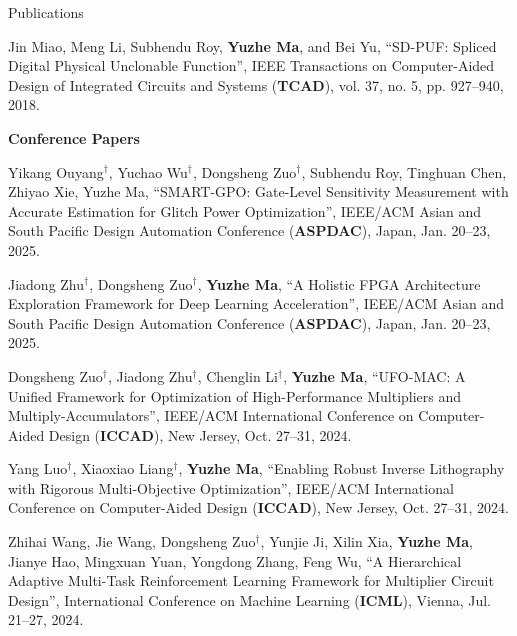 \begin{rSection}{Publications}
\begin{etaremune}
\item{
	Jin Miao, Meng Li, Subhendu Roy, \textbf{Yuzhe Ma}, and Bei Yu,
	``SD-PUF: Spliced Digital Physical Unclonable Function'',
	IEEE Transactions on Computer-Aided Design of Integrated Circuits and Systems (\textbf{TCAD}), vol. 37, no. 5, pp. 927--940, 2018.
}
\end{etaremune}


\textbf{Conference Papers}
\begin{etaremune}
	\renewcommand{\labelenumi}{[C\theenumi]}

\item{
    Yikang Ouyang$^\dagger$, Yuchao Wu$^\dagger$, Dongsheng Zuo$^\dagger$, Subhendu Roy, Tinghuan Chen, Zhiyao Xie, Yuzhe Ma,
    ``SMART-GPO: Gate-Level Sensitivity Measurement with Accurate Estimation for Glitch Power Optimization'',
    IEEE/ACM Asian and South Pacific Design Automation Conference (\textbf{ASPDAC}), Japan, Jan. 20–23, 2025.
}

\item{
    Jiadong Zhu$^\dagger$, Dongsheng Zuo$^\dagger$, \textbf{Yuzhe Ma},
    ``A Holistic FPGA Architecture Exploration Framework for Deep Learning Acceleration'',
    IEEE/ACM Asian and South Pacific Design Automation Conference (\textbf{ASPDAC}), Japan, Jan. 20–23, 2025.
}

\item {
    Dongsheng Zuo$^\dagger$, Jiadong Zhu$^\dagger$, Chenglin Li$^\dagger$, \textbf{Yuzhe Ma},
    ``UFO-MAC: A Unified Framework for Optimization of High-Performance Multipliers and Multiply-Accumulators'',
    IEEE/ACM International Conference on Computer-Aided Design (\textbf{ICCAD}), New Jersey, Oct. 27–31, 2024.
}

\item {
    Yang Luo$^\dagger$, Xiaoxiao Liang$^\dagger$, \textbf{Yuzhe Ma},
    ``Enabling Robust Inverse Lithography with Rigorous Multi-Objective Optimization'',
    IEEE/ACM International Conference on Computer-Aided Design (\textbf{ICCAD}), New Jersey, Oct. 27–31, 2024.
}

\item {
    Zhihai Wang, Jie Wang, Dongsheng Zuo$^\dagger$, Yunjie Ji, Xilin Xia, \textbf{Yuzhe Ma}, Jianye Hao, Mingxuan Yuan, Yongdong Zhang, Feng Wu,
    ``A Hierarchical Adaptive Multi-Task Reinforcement Learning Framework for Multiplier Circuit Design'',
    International Conference on Machine Learning (\textbf{ICML}), Vienna, Jul. 21–27, 2024.
}


\end{etaremune}
\end{rSection}
